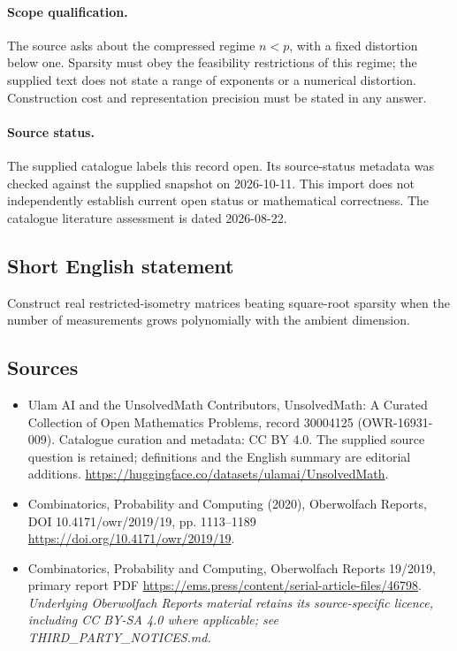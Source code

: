 \documentclass[11pt]{article}
\begin{document}
\paragraph{Scope qualification.}
The source asks about the compressed regime $n<p$, with a fixed distortion below one. Sparsity must obey the feasibility restrictions of this regime; the supplied text does not state a range of exponents or a numerical distortion. Construction cost and representation precision must be stated in any answer.
\paragraph{Source status.}
The supplied catalogue labels this record open. Its source-status metadata was checked against the supplied snapshot on 2026-10-11. This import does not independently establish current open status or mathematical correctness. The catalogue literature assessment is dated 2026-08-22.
\subsection{Short English statement}
Construct real restricted-isometry matrices beating square-root sparsity when the number of measurements grows polynomially with the ambient dimension.
\subsection{Sources}
\begin{itemize}
\item[S1] Ulam AI and the UnsolvedMath Contributors, UnsolvedMath: A Curated Collection of Open Mathematics Problems, record 30004125 (OWR-16931-009). Catalogue curation and metadata: CC BY 4.0. The supplied source question is retained; definitions and the English summary are editorial additions.
\url{https://huggingface.co/datasets/ulamai/UnsolvedMath}.
\item[S2] Combinatorics, Probability and Computing (2020), Oberwolfach Reports, DOI 10.4171/owr/2019/19, pp. 1113--1189
\url{https://doi.org/10.4171/owr/2019/19}.
\item[S3] Combinatorics, Probability and Computing, Oberwolfach Reports 19/2019, primary report PDF
\url{https://ems.press/content/serial-article-files/46798}.
\textit{Underlying Oberwolfach Reports material retains its source-specific licence, including CC BY-SA 4.0 where applicable; see THIRD\_PARTY\_NOTICES.md.}
\end{itemize}
\end{document}
